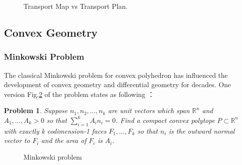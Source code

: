 \documentclass[runningheads]{llncs}
\newtheorem{mypro}{Problem}
\begin{document}
\begin{figure}
\centering
{}
\caption{Transport Map vs Transport Plan.}
\label{fig:vs}
\end{figure}




\subsection{Convex Geometry}

\subsubsection{Minkowski Problem}
The classical Minkowski problem for convex polyhedron has influenced the development of convex geometry and differential geometry for decades. One version  Fig.\ref{fig:Mink} of the problem states as following ：
\begin{mypro}
Suppose $n_1, n_2, ..., n_k$ are unit vectors which span $\mathbb{R}^n$ and $A_1,..., A_k>0$ so that $\sum^k_{i=1}A_in_i=0$. Find a compact convex polytope $P\subset \mathbb{R}^n$ with exactly k codimension-1 faces $F_1,...,F_k$ so that $n_i$ is the outward normal vector to $F_i$ and the area of $F_i$ is $A_i$.
\end{mypro}

\begin{figure}
\centering
{}
\caption{Minkowski problem}
\label{fig:Mink}
\end{figure}
\end{document}
